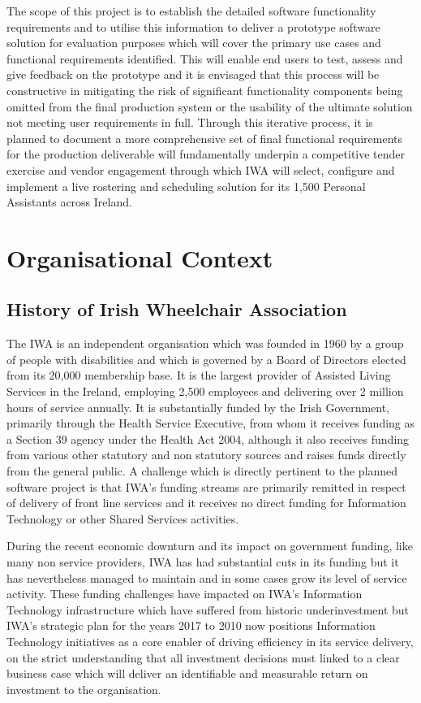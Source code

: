 \documentclass[a4paper,12pt]{article}
\begin{document}
The scope of this project is to establish the detailed software functionality requirements and to utilise this information to deliver a prototype software solution for evaluation purposes which will cover the primary use cases and functional requirements identified. This will enable end users to test, assess and give feedback on the prototype and it is envisaged that this process will be constructive in mitigating the risk of significant functionality components being omitted from the final production system or the usability of the ultimate solution not meeting user requirements in full. Through this iterative process, it is planned to document a more comprehensive set of final functional requirements for the production deliverable will fundamentally underpin a competitive tender exercise and vendor engagement through which IWA will select, configure and implement a live rostering and scheduling solution for its 1,500 Personal Assistants across Ireland.


\section{Organisational Context}
\subsection {History of Irish Wheelchair Association}
The IWA is an independent organisation which was founded in 1960 by a group of people with disabilities and which is governed by a Board of Directors elected from its 20,000 membership base. It is the largest provider of Assisted Living Services in the Ireland, employing 2,500 employees and delivering over 2 million hours of service annually. It is substantially funded by the Irish Government, primarily through the Health Service Executive, from whom it receives funding as a Section 39 agency under the Health Act 2004, although it also receives funding from various other statutory and non statutory sources and raises funds directly from the general public. A challenge which is directly pertinent to the planned software project is that IWA's funding streams are primarily remitted in respect of delivery of front line services and it receives no direct funding for Information Technology or other Shared Services activities.

During the recent economic downturn and its impact on government funding, like many non service providers, IWA has had substantial cuts in its funding but it has nevertheless managed to maintain and in some cases grow its level of service activity. These funding challenges have impacted on IWA's Information Technology infrastructure which have suffered from historic underinvestment but IWA's strategic plan for the years 2017 to 2010 now positions Information Technology initiatives as a core enabler of driving efficiency in its service delivery, on the strict understanding that all investment decisions must linked to a clear business case which will deliver an identifiable and measurable return on investment to the organisation.
\end{document}
